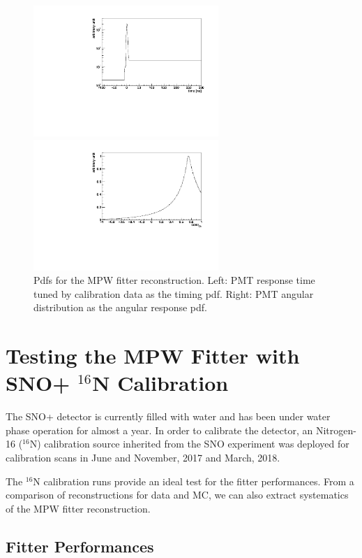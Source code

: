 \documentclass[preprint,12pt]{elsarticle}
\numberwithin{equation}{section}
\begin{document}
\begin{figure}[htbp]
	\centering
	\begin{minipage}[t]{0.48\textwidth}
		\centering
		\includegraphics[width=7cm]{MPW_timingPDF.pdf}
	\end{minipage}
	\begin{minipage}[t]{0.48\textwidth}
		\centering
		\includegraphics[width=7cm]{MPW_angularPDF.pdf}
	\end{minipage}
	\caption{Pdfs for the MPW fitter reconstruction. Left: PMT response time tuned by calibration data as the timing pdf. Right: PMT angular distribution as the angular response pdf.}
    \label{mpwpdf}
\end{figure}

\section{Testing the MPW Fitter with SNO+ $^{16}$N Calibration}
The SNO+ detector is currently filled with water and has been under water phase operation for almost a year. In order to calibrate the detector, an Nitrogen-16 ($^{16}$N) calibration source inherited from the SNO experiment was deployed for calibration scans in June and November, 2017 and March, 2018. 

The $^{16}$N calibration runs provide an ideal test for the fitter performances. From a comparison of reconstructions for data and MC, we can also extract systematics of the MPW fitter reconstruction. 

\subsection{Fitter Performances}
\end{document}
